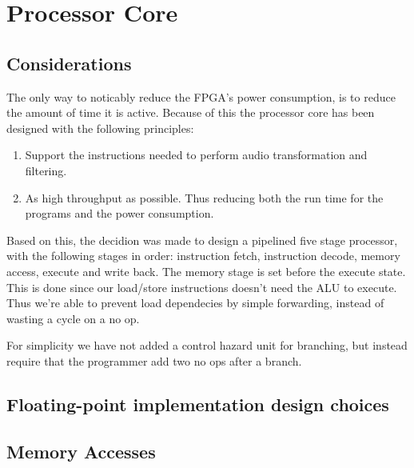 \FloatBarrier
\section{Processor Core}\label{section:fpga-processor-core}

\subsection{Considerations}

The only way to noticably reduce the FPGA's power consumption, is to reduce the
amount of time it is active. Because of this the processor core has been designed with
the following principles:

\begin{enumerate}
	\item Support the instructions needed to perform audio transformation and filtering.
	\item As high throughput as possible. Thus reducing both the run time for the programs and the power consumption.
\end{enumerate}

Based on this, the decidion was made to design a pipelined five stage processor,
with the following stages in order: instruction fetch, instruction decode,
memory access, execute and write back. The memory stage is set before the
execute state. This is done since our load/store instructions doesn't need the
ALU to execute. Thus we're able to prevent load dependecies by simple
forwarding, instead of wasting a cycle on a no op.

For simplicity we have not added a control hazard unit for branching, but instead require that the programmer add two no ops after a branch.


\subsection{Floating-point implementation design choices}

\subsection{Memory Accesses}

